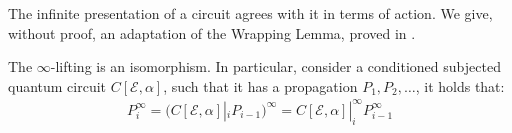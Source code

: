 The infinite presentation of a circuit agrees with it in terms of action. We give, without proof, an adaptation of the Wrapping Lemma, proved in \cite{schumacher2004reversiblequantumcellularautomata}.
\begin{claim}
The $\infty$-lifting is an isomorphism. In particular, consider a conditioned subjected quantum circuit $C[\mathcal{E},\alpha]$, such that it has a propagation $P_{1},P_{2},\ldots$, it holds that:
  \begin{equation*}
    \begin{split}
    P_{i}^{\infty} =  (C[\mathcal{E},\alpha]|_{ i} P_{i-1})^{\infty} =   C[\mathcal{E},\alpha]|_{ i}^{\infty} P_{i-1}^{\infty} 
    \end{split}
  \end{equation*}
\end{claim}



